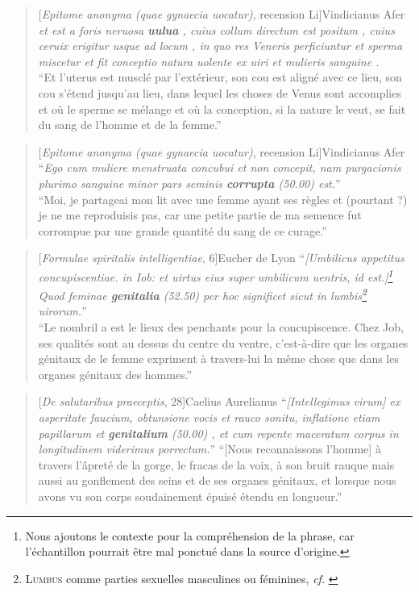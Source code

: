 \starbreak

\begin{quote}[\textit{Epitome anonyma (quae gynaecia uocatur)}, recension Li]{Vindicianus Afer}
    \textit{et est a foris neruosa \textbf{uulua} , cuius collum directum est positum , cuius ceruix erigitur usque ad locum , in quo res Veneris perficiuntur et sperma miscetur et fit conceptio natura uolente ex uiri et mulieris sanguine .} \\
    \enquote{Et l'uterus est musclé par l'extérieur, son cou est aligné avec ce lieu, son cou s'étend jusqu'au lieu, dans lequel les choses de Venus sont accomplies et où le sperme se mélange et où la conception, si la nature le veut, se fait du sang de l'homme et de la femme.}
\end{quote}

\begin{quote}[\textit{Epitome anonyma (quae gynaecia uocatur)}, recension Li]{Vindicianus Afer}
    \enquote{\textit{Ego cum muliere menstruata concubui et non concepit, nam purgacionis plurimo sanguine minor pars seminis \textbf{corrupta} (50.00) est.}} \\
    \enquote{Moi, je partageai mon lit avec une femme ayant ses règles et (pourtant ?) je ne me reproduisis pas, car une petite partie de ma semence fut corrompue par une grande quantité du sang de ce curage.}
\end{quote}

\begin{quote}[\textit{Formulae spiritalis intelligentiae}, 6]{Eucher de Lyon}
    \enquote{\textit{{[}Umbilicus appetitus concupiscentiae. in Iob: et uirtus eius super umbilicum uentris, id est.{]}\footnote{Nous ajoutons le contexte pour la compréhension de la phrase, car l'échantillon pourrait être mal ponctué dans la source d'origine.} Quod feminae \textbf{genitalia} (52.50) per hoc significet sicut in lumbis\footnote{\textsc{Lumbus} comme parties sexuelles masculines ou féminines, \textit{cf.} \textcite[p.~48]{adams}} uirorum.}} \\
    \enquote{Le nombril a est le lieux des penchants pour la concupiscence. Chez Job, ses qualités sont au dessus du centre du ventre, c'est-à-dire que les organes génitaux de le femme expriment à travers-lui la même chose que dans les organes génitaux des hommes.}
\end{quote}

\begin{quote}[\textit{De salutaribus praeceptis}, 28]{Caelius Aurelianus}
    \enquote{\textit{{[}Intellegimus virum{]} ex asperitate faucium, obtunsione vocis et rauco sonitu, inflatione etiam papillarum et \textbf{genitalium} (50.00) , et cum repente maceratum corpus in longitudinem viderimus porrectum.}}
    \enquote{{[}Nous reconnaissons l'homme{]} à travers l'âpreté de la gorge, le fracas de la voix, à son bruit rauque mais aussi au gonflement des seins et de ses organes génitaux, et lorsque nous avons vu son corps soudainement épuisé étendu en longueur.}
\end{quote}

